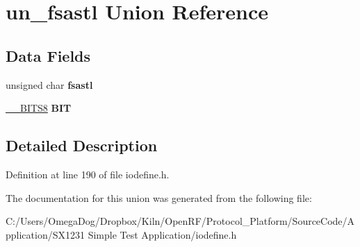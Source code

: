 \hypertarget{unionun__fsastl}{\section{un\-\_\-fsastl Union Reference}
\label{unionun__fsastl}
}
\subsection*{Data Fields}
\begin{DoxyCompactItemize}
\item 
\hypertarget{unionun__fsastl_a6209e9763c06461ebc185c8d325e42c4}{unsigned char {\bfseries fsastl}}\label{unionun__fsastl_a6209e9763c06461ebc185c8d325e42c4}

\item 
\hypertarget{unionun__fsastl_a6213b17b6229f3ad02a9adfa194b2e64}{\hyperlink{struct_____b_i_t_s8}{\-\_\-\-\_\-\-B\-I\-T\-S8} {\bfseries B\-I\-T}}\label{unionun__fsastl_a6213b17b6229f3ad02a9adfa194b2e64}

\end{DoxyCompactItemize}


\subsection{Detailed Description}


Definition at line 190 of file iodefine.\-h.



The documentation for this union was generated from the following file\-:\begin{DoxyCompactItemize}
\item 
C\-:/\-Users/\-Omega\-Dog/\-Dropbox/\-Kiln/\-Open\-R\-F/\-Protocol\-\_\-\-Platform/\-Source\-Code/\-Application/\-S\-X1231 Simple Test Application/iodefine.\-h\end{DoxyCompactItemize}
